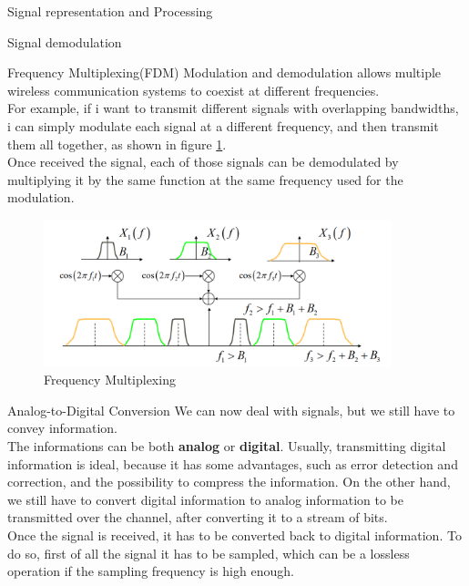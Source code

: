 \begin{section}{Signal representation and Processing}
\begin{subsection}{Signal demodulation}
    \end{subsection}
    \begin{subsection}{Frequency Multiplexing(FDM)}
      Modulation and demodulation allows multiple wireless communication systems to coexist at different
      frequencies.\\
      For example, if i want to transmit different signals with overlapping bandwidths, i can simply
      modulate each signal at a different frequency, and then transmit them all together, as shown in
      figure \ref{fig:FDM}.\\
      Once received the signal, each of those signals can be demodulated by multiplying it by the 
      same function at the same frequency used for the modulation.\\
      \begin{figure}[h]
        \centering
        \includegraphics[width=0.9\textwidth]{img/wireless/FDM.png}
        \caption{Frequency Multiplexing}
        \label{fig:FDM}
      \end{figure}
    \end{subsection}
    \begin{subsection}{Analog-to-Digital Conversion}
      We can now deal with signals, but we still have to convey information.\\
      The informations can be both \textbf{analog} or \textbf{digital}. Usually, transmitting digital
      information is ideal, because it has some advantages, such as error detection and correction,
      and the possibility to compress the information. On the other hand, we still have to convert
      digital information to analog information to be transmitted over the channel, after converting
      it to a stream of bits.\\
      Once the signal is received, it has to be converted back to digital information. To do so,
      first of all the signal it has to be sampled, which can be a lossless operation if the sampling
      frequency is high enough.\\

\end{subsection}
\end{section}
